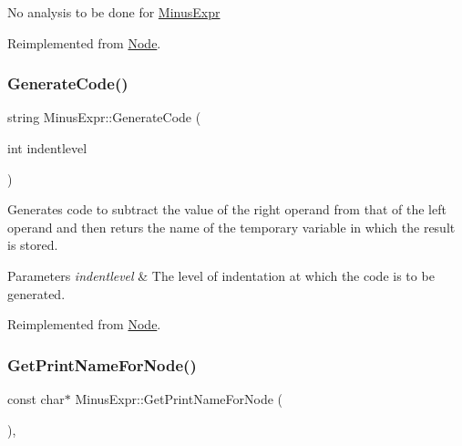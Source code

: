 No analysis to be done for \hyperlink{class_minus_expr}{Minus\+Expr} 

Reimplemented from \hyperlink{class_node_a5f88d55c6f253a29def7ccc443d83d47}{Node}.

\mbox{\label{class_minus_expr_a1f5c55747832a48d6dc28d1233b16a7c}} 
\subsubsection{\texorpdfstring{Generate\+Code()}{GenerateCode()}}
{\footnotesize\ttfamily string Minus\+Expr\+::\+Generate\+Code (\begin{DoxyParamCaption}\item[{int}]{indentlevel }\end{DoxyParamCaption})\hspace{0.3cm}{\ttfamily [virtual]}}

Generates code to subtract the value of the right operand from that of the left operand and then returs the name of the temporary variable in which the result is stored. 
\begin{DoxyParams}{Parameters}
{\em indentlevel} & The level of indentation at which the code is to be generated. \\
\hline
\end{DoxyParams}


Reimplemented from \hyperlink{class_node_acb60e526730e8436056375a3055c2c32}{Node}.

\mbox{\label{class_minus_expr_a1b0d17900f1686776d05a5d18233aa2e}} 
\subsubsection{\texorpdfstring{Get\+Print\+Name\+For\+Node()}{GetPrintNameForNode()}}
{\footnotesize\ttfamily const char$\ast$ Minus\+Expr\+::\+Get\+Print\+Name\+For\+Node (\begin{DoxyParamCaption}{ }\end{DoxyParamCaption})\hspace{0.3cm}{\ttfamily [inline]}, {\ttfamily [virtual]}}

